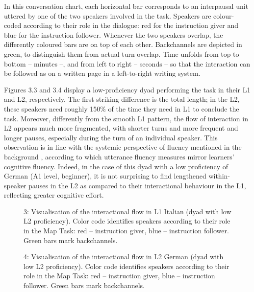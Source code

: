 In this conversation chart, each horizontal bar corresponds to an interpausal unit uttered by one of the two speakers involved in the task. Speakers are colour-coded according to their role in the dialogue: red for the instruction giver and blue for the instruction follower. Whenever the two speakers overlap, the differently coloured bars are on top of each other. Backchannels are depicted in green, to distinguish them from actual turn overlap. Time unfolds from top to bottom – minutes –, and from left to right – seconds – so that the interaction can be followed as on a written page in a left-to-right writing system.

Figures 3.3 and 3.4 display a low-proficiency dyad performing the task in their L1 and L2, respectively. The first striking difference is the total length; in the L2, these speakers need roughly 150\% of the time they need in L1 to conclude the task. Moreover, differently from the smooth L1 pattern, the flow of interaction in L2 appears much more fragmented, with shorter turns and more frequent and longer pauses, especially during the turn of an individual speaker. This observation is in line with the systemic perspective of fluency mentioned in the background \citep{Kormos2006}, according to which utterance fluency measures mirror learners’ cognitive fluency. Indeed, in the case of this dyad with a low proficiency of German (A1 level, beginner), it is not surprising to find lengthened within-speaker pauses in the L2 as compared to their interactional behaviour in the L1, reflecting greater cognitive effort.

  
 

\begin{stylecaption}\begin{figure}
\caption{3: Visualisation of the interactional flow in L1 Italian (dyad with low L2 proficiency). Color code identifies speakers according to their role in the Map Task: red – instruction giver, blue – instruction follower. Green bars mark backchannels.}
\label{fig:key:3}
\end{figure}\end{stylecaption}

  
 

\begin{stylecaption}\begin{figure}
\caption{4: Visualisation of the interactional flow in L2 German (dyad with low L2 proficiency). Color code identifies speakers according to their role in the Map Task: red – instruction giver, blue – instruction follower. Green bars mark backchannels.}
\label{fig:key:3}
\end{figure}\end{stylecaption}

